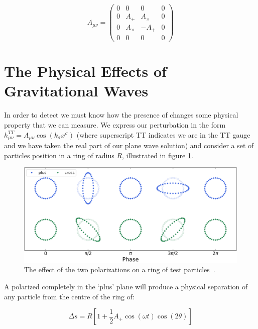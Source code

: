\begin{equation}
   A_{\mu \nu} =
   \begin{pmatrix}
      0 & 0 & 0 & 0 \\
      0 & A_+ & A_\times & 0 \\
      0 & A_\times & -A_+ & 0 \\
      0 & 0 & 0 & 0
   \end{pmatrix}
   \label{eqn:A_mu_nu}
\end{equation}

\section{\label{sec:Mechanics}The Physical Effects of Gravitational Waves}

In order to detect \gws we must know how the presence of \gws changes some physical property that we can measure. We express our perturbation in the form $h_{\mu \nu}^{TT} = A_{\mu \nu} \cos(k_\sigma x^\sigma)$ (where superscript TT
indicates we are in the TT gauge and we have taken the real part of our plane wave solution) and consider a set of particles position in a ring of radius $R$, illustrated in figure \ref{fig:polarization}.

\begin{figure}
   \includegraphics[width=\textwidth]{images/1_general_relativity/polarization.png}
   \caption{\label{fig:polarization}The effect of the two polarizations on a ring of test particles~\cite{gw_polarization_plots}.}
\end{figure}

A \gw polarized completely in the `plus' plane will produce a physical separation of any particle from the centre of the ring of:

\begin{equation}
   \Delta s = R[1 + \frac{1}{2} A_+ \cos(\omega t) \cos(2 \theta)]
   \label{eqn:plus_separation}
\end{equation}

